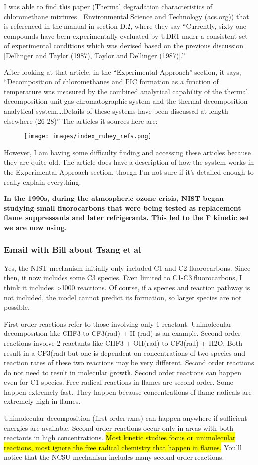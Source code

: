 \documentclass{article}
\begin{document}
I was able to find this paper (Thermal degradation characteristics of chloromethane mixtures | Environmental Science and Technology (acs.org)) that is referenced in the manual in section D.2, where they say “Currently, sixty-one compounds have been experimentally evaluated by UDRI under a consistent set of experimental conditions which was devised based on the previous discussion [Dellinger and Taylor (1987), Taylor and Dellinger (1987)].” 
                
After looking at that article, in the “Experimental Approach” section, it says, “Decomposition of chloromethanes and PIC formation as a function of temperature was measured by the combined analytical capability of the thermal decomposition unit-gas chromatographic system and the thermal decomposition analytical system….Details of these systems have been discussed at length elsewhere (26-28)” The articles it sources here are:
\begin{figure}[H]
    \centering
    \texttt{[image: images/index\_rubey\_refs.png]}
    \end{figure}
 
However, I am having some difficulty finding and accessing these articles because they are quite old. The article does have a description of how the system works in the Experimental Approach section, though I’m not sure if it’s detailed enough to really explain everything.

\textbf{In the 1990s, during the atmospheric ozone crisis, NIST began studying small fluorocarbons that were being tested as replacement flame suppressants and later refrigerants.  This led to the F kinetic set we are now using.}
\subsubsection*{Email with Bill about Tsang et al}
Yes, the NIST mechanism initially only included C1 and C2 fluorocarbons.  Since then, it now includes some C3 species.  Even limited to C1-C3 fluorocarbons, I think it includes >1000 reactions.  Of course, if a species and reaction pathway is not included, the model cannot predict its formation, so larger species are not possible.

First order reactions refer to those involving only 1 reactant.  Unimolecular decomposition like CHF3 to CF3(rad) + H (rad) is an example.  Second order reactions involve 2 reactants like CHF3 + OH(rad) to CF3(rad) + H2O.  Both result in a CF3(rad) but one is dependent on concentrations of two species and reaction rates of these two reactions may be very different.  Second order reactions do not need to result in molecular growth.  Second order reactions can happen even for C1 species.  Free radical reactions in flames are second order.  Some happen extremely fast.  They happen because concentrations of flame radicals are extremely high in flames.  

Unimolecular decomposition (first order rxns) can happen anywhere if sufficient energies are available.  Second order reactions occur only in areas with both reactants in high concentrations.  \hl{Most kinetic studies focus on unimolecular reactions, most ignore the free radical chemistry that happen in flames.}  You’ll notice that the NCSU mechanism includes many second order reactions.
\end{document}

